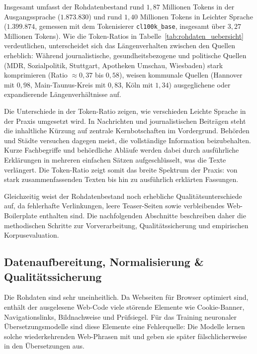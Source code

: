 Insgesamt umfasst der Rohdatenbestand rund $1{,}87$ Millionen Tokens in der Ausgangssprache ($1.873.830$) und rund $1{,}40$ Millionen Tokens in Leichter Sprache ($1.399.874$, gemessen mit dem Tokenisierer \texttt{cl100k\_base}, insgesamt über $3{,}27$ Millionen Tokens). Wie die Token-Ratios in Tabelle~\ref{tab:rohdaten_uebersicht} verdeutlichen, unterscheidet sich das Längenverhalten zwischen den Quellen erheblich: Während journalistische, gesundheitsbezogene und politische Quellen (MDR, Sozialpolitik, Stuttgart, Apotheken Umschau, Wiesbaden) stark komprimieren (Ratio $\approx 0{,}37$ bis $0{,}58$), weisen kommunale Quellen (Hannover mit $0{,}98$, Main-Taunus-Kreis mit $0{,}83$, Köln mit $1{,}34$) ausgeglichene oder expandierende Längenverhältnisse auf. 

Die Unterschiede in der Token-Ratio zeigen, wie verschieden Leichte Sprache in der Praxis umgesetzt wird. In Nachrichten und journalistischen Beiträgen steht die inhaltliche Kürzung auf zentrale Kernbotschaften im Vordergrund. Behörden und Städte versuchen dagegen meist, die vollständige Information beizubehalten. Kurze Fachbegriffe und behördliche Abläufe werden dabei durch ausführliche Erklärungen in mehreren einfachen Sätzen aufgeschlüsselt, was die Texte verlängert. Die Token-Ratio zeigt somit das breite Spektrum der Praxis: von stark zusammenfassenden Texten bis hin zu ausführlich erklärten Fassungen.

Gleichzeitig weist der Rohdatenbestand noch erhebliche Qualitätsunterschiede auf, da fehlerhafte Verlinkungen, leere Teaser-Seiten sowie verbleibendes Web-Boilerplate enthalten sind. Die nachfolgenden Abschnitte beschreiben daher die methodischen Schritte zur Vorverarbeitung, Qualitätssicherung und empirischen Korpusevaluation.

\subsection{Datenaufbereitung, Normalisierung \& Qualitätssicherung}
\label{sec:datenbereinigung_normalisierung}

Die Rohdaten sind sehr uneinheitlich. Da Webseiten für Browser optimiert sind, enthält der ausgelesene Web-Code viele störende Elemente wie Cookie-Banner, Navigationslinks, Bildnachweise und Prüfsiegel. Für das Training neuronaler Übersetzungsmodelle sind diese Elemente eine Fehlerquelle: Die Modelle lernen solche wiederkehrenden Web-Phrasen mit und geben sie später fälschlicherweise in den Übersetzungen aus.

